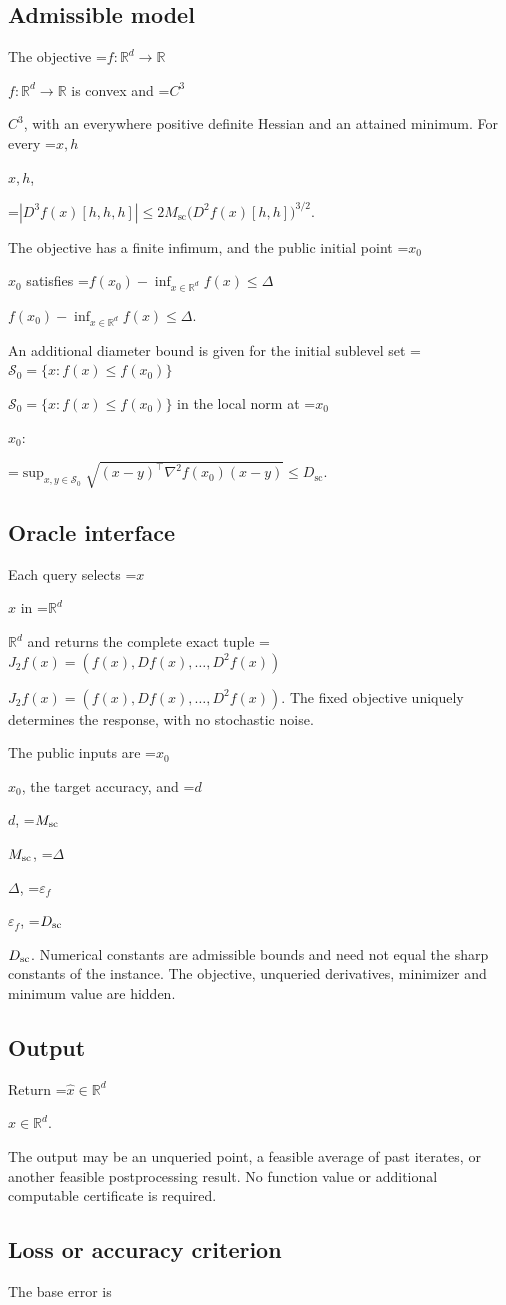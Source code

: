 \documentclass[10pt,a4paper]{article}
\newcommand{\AtlasMath}[1]{\par\begingroup\centering\setbox0=\hbox{$\displaystyle #1$}\ifdim\wd0>1.4\linewidth\typeout{ATLAS WIDE FORMULA: \the\wd0}\fi\ifdim\wd0>\linewidth\resizebox{\linewidth}{!}{\box0}\else\box0\fi\par\endgroup}
\newcommand{\AtlasInlineMath}[1]{\begingroup\setbox0=\hbox{$#1$}\ifdim\wd0>.4\linewidth\endgroup\AtlasMath{#1}\else\endgroup$#1$\fi}
\begin{document}
\subsection{Admissible model}
The objective \AtlasInlineMath{f:\mathbb{R}^d\to\mathbb{R}} is convex and \AtlasInlineMath{C^3}, with an everywhere positive definite Hessian and an attained minimum. For every \AtlasInlineMath{x,h},


\AtlasMath{|D^3f(x)[h,h,h]|\le2M_{\mathrm{sc}}\bigl(D^2f(x)[h,h]\bigr)^{3/2}.}


The objective has a finite infimum, and the public initial point \AtlasInlineMath{x_0} satisfies \AtlasInlineMath{f(x_0)-\inf_{x\in \mathbb{R}^d}f(x)\le\Delta}.

An additional diameter bound is given for the initial sublevel set \AtlasInlineMath{\mathcal{S}_0=\{x:f(x)\le f(x_0)\}} in the local norm at \AtlasInlineMath{x_0}:


\AtlasMath{\sup_{x,y\in\mathcal{S}_0}\sqrt{(x-y)^\top\nabla^2f(x_0)(x-y)}\le D_{\mathrm{sc}}.}


\subsection{Oracle interface}
Each query selects \AtlasInlineMath{x} in \AtlasInlineMath{\mathbb{R}^d} and returns the complete exact tuple \AtlasInlineMath{J_{2}f(x)=(f(x),Df(x),\ldots,D^{2}f(x))}. The fixed objective uniquely determines the response, with no stochastic noise.

The public inputs are \AtlasInlineMath{x_0}, the target accuracy, and \AtlasInlineMath{d}, \AtlasInlineMath{M_{\rm sc}}, \AtlasInlineMath{\Delta}, \AtlasInlineMath{\varepsilon_f}, \AtlasInlineMath{D_{\rm sc}}. Numerical constants are admissible bounds and need not equal the sharp constants of the instance. The objective, unqueried derivatives, minimizer and minimum value are hidden.

\subsection{Output}
Return \AtlasInlineMath{\widehat{x}\in \mathbb{R}^d}.

The output may be an unqueried point, a feasible average of past iterates, or another feasible postprocessing result. No function value or additional computable certificate is required.

\subsection{Loss or accuracy criterion}
The base error is
\end{document}
